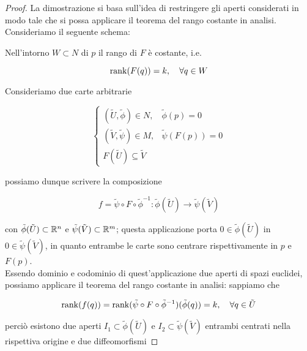 \begin{proof}
	La dimostrazione si basa sull'idea di restringere gli aperti considerati in modo tale che si possa applicare il teorema del rango costante in analisi.\\
	Consideriamo il seguente schema:
	

	Nell'intorno $ W \subset N $ di $ p $ il rango di $ F $ è costante, i.e.
	
	\begin{equation}
		\rank(F(q)) = k \qcomma \forall q \in W
	\end{equation}

	Consideriamo due carte arbitrarie
	
	\begin{equation}
		\begin{cases}
			(\tilde{U},\tilde{\phi}) \in N, & \tilde{\phi}(p) = 0 \\
			(\tilde{V},\tilde{\psi}) \in M, & \tilde{\psi}(F(p)) = 0 \\
			F(\tilde{U}) \subseteq \tilde{V}
		\end{cases}
	\end{equation}

	 possiamo dunque scrivere la composizione
	
	\begin{equation}
		f = \tilde{\psi} \circ F \circ \tilde{\phi}^{-1} : \tilde{\phi}(\tilde{U}) \to \tilde{\psi}(\tilde{V})
	\end{equation}

	con $ \tilde{\phi}(\tilde{U}) \subset \mathbb{R}^{n} $ e $ \tilde{\psi}(\tilde{V}) \subset \mathbb{R}^{m} $; questa applicazione porta $ 0 \in \tilde{\phi}(\tilde{U}) $ in $ 0 \in \tilde{\psi}(\tilde{V}) $, in quanto entrambe le carte sono centrare rispettivamente in $ p $ e $ F(p) $.\\
	Essendo dominio e codominio di quest'applicazione due aperti di spazi euclidei, possiamo applicare il teorema del rango costante in analisi: sappiamo che
	
	\begin{equation}
		\rank(f(q)) = \rank(\tilde{\psi} \circ F \circ \tilde{\phi}^{-1})(\tilde{\phi}(q)) = k \qcomma \forall q \in \tilde{U}
	\end{equation}

	perciò esistono due aperti $ I_{1} \subset \tilde{\phi}(\tilde{U}) $ e $ I_{2} \subset \tilde{\psi}(\tilde{V}) $ entrambi centrati nella rispettiva origine e due diffeomorfismi
	

\end{proof}
